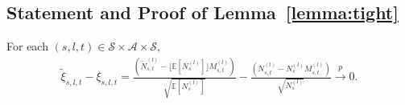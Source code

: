 \documentclass[twoside,11pt]{article}
\newcommand{\pow}[1]{^{(#1)}}%
\numberwithin{equation}{section}
\newcommand{\lp}{\left(}
\newcommand{\rp}{\right)}
\newcommand{\expec}{\mathbb{E}}
\begin{document}
\subsection{Statement and Proof of Lemma~\ref{lemma:tight}}
\label{sec:lemma_tight}
\begin{lemma}\label{lemma:tight}
For each $(s,l,t) \in \mathcal S \times \mathcal A \times \mathcal S$,
    \begin{align*}
        \tilde \xi_{s,l,t} - \xi_{s,l,t} = \frac{\lp\tilde N_{s,t}\pow l - \lfloor \expec[N_s\pow l]\rfloor M_{s,t}\pow l \rp}{\sqrt{\expec[N_s\pow l]}} - \frac{\lp{ N_{s,t}\pow l-N_{s}\pow l M_{s,t}\pow l}\rp}{\sqrt{N_s\pow l}}\xrightarrow{\ p \ } 0.
    \end{align*}
\end{lemma}

\end{document}
